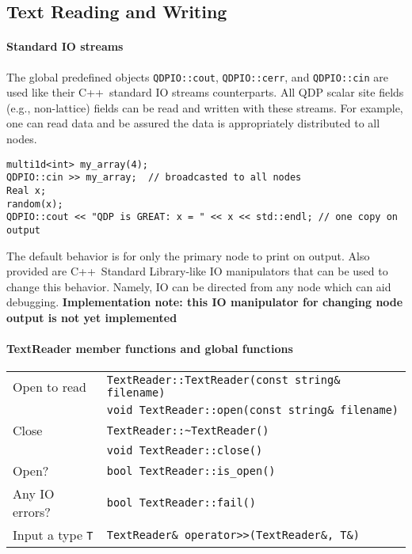 \documentclass[12pt,letterpaper]{article}
\newcommand{\cpp}{C++}
\begin{document}
\subsection{Text Reading and Writing}
\label{sec:textio}

\paragraph{Standard IO streams}

The global predefined objects \verb|QDPIO::cout|, \verb|QDPIO::cerr|,
and \verb|QDPIO::cin| are used like their \cpp\ standard IO streams 
counterparts. All QDP scalar site fields (e.g., non-lattice) fields
can be read and written with these streams. For example, one can
read data and be assured the data is appropriately distributed to
all nodes.
%
\begin{small}
\begin{verbatim}
multi1d<int> my_array(4);
QDPIO::cin >> my_array;  // broadcasted to all nodes
Real x;
random(x);
QDPIO::cout << "QDP is GREAT: x = " << x << std::endl; // one copy on output
\end{verbatim}
\end{small}
%
The default behavior is for only the primary node to print on output.
Also provided are \cpp\ Standard Library-like IO manipulators that can 
be used to change this behavior. Namely, IO can be directed from any
node which can aid debugging.
{\bf Implementation note: this IO manipulator for changing node output is not yet implemented}


\paragraph{TextReader member functions and global functions}

\begin{flushleft}
  \begin{tabular}{|l|l|}
  \hline
  Open to read   & \verb|TextReader::TextReader(const string& filename)|\\
                 & \verb|void TextReader::open(const string& filename)|\\
  \hline
  Close          & \verb|TextReader::~TextReader()|\\
                 & \verb|void TextReader::close()|\\
  \hline
  Open?          & \verb|bool TextReader::is_open()| \\
  \hline
  Any IO errors? & \verb|bool TextReader::fail()| \\
  \hline
  Input a type \verb|T| & \verb|TextReader& operator>>(TextReader&, T&)| \\
  \hline
 \end{tabular}
\end{flushleft}
\end{document}
